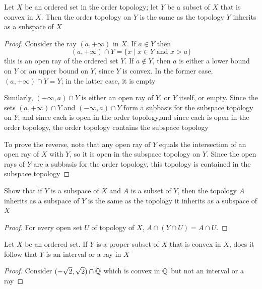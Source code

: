 \documentclass[11pt]{article}
\begin{document}
\begin{theorem}[]
Let \(X\) be an ordered set in the order topology; let \(Y\) be a subset of \(X\) that is convex
in \(X\). Then the order topology on \(Y\) is the same as the topology \(Y\) inherits as a
subspace of \(X\)
\end{theorem}

\begin{proof}
Consider the ray \((a,+\infty)\) in \(X\). If \(a\in Y\) then
\begin{equation*}
(a,+\infty)\cap Y=\{x\mid x\in Y\text{ and }x>a\}
\end{equation*}
this is an open ray of the ordered set \(Y\). If \(a\not\in Y\), then \(a\) is either a lower bound
on \(Y\) or an upper bound on \(Y\), since \(Y\) is convex. In the former case, \((a,+\infty)\cap Y=Y\);
in the latter case, it is empty

Similarly, \((-\infty,a)\cap Y\) is either an open ray of \(Y\), or \(Y\) itself, or empty. Since the
sets \((a,+\infty)\cap Y\) and \((-\infty,a)\cap Y\) form a subbasis for the subspace topology on \(Y\), and
since each is open in the order topology,and since each is open in the order topology,
the order topology contains the subspace topology

To prove the reverse, note that any open ray of \(Y\) equals the intersection of an open ray
of \(X\) with \(Y\), so it is open in the subspace topology on \(Y\). Since the open rays
of \(Y\) are a subbasis for the order topology, this topology is contained in the subspace topology
\end{proof}

\begin{exercise}
\label{15.1}
Show that if \(Y\) is a subspace of \(X\) and \(A\) is a subset of \(Y\), then the topology \(A\)
inherits as a subspace of \(Y\) is the same as the topology it inherits as a subspace of \(X\)
\end{exercise}

\begin{proof}
For every open set \(U\) of topology of \(X\), \(A\cap(Y\cap U)=A\cap U\).
\end{proof}

\begin{exercise}
\label{ex15.7}
Let \(X\) be an ordered set. If \(Y\) is a proper subset of \(X\) that is convex in \(X\), does
it follow that \(Y\) is an interval or a ray in \(X\)
\end{exercise}

\begin{proof}
Consider \((-\sqrt{2},\sqrt{2})\cap\mathbb{Q}\) which is convex in \(\mathbb{Q}\) but not an interval or a ray
\end{proof}
\end{document}
